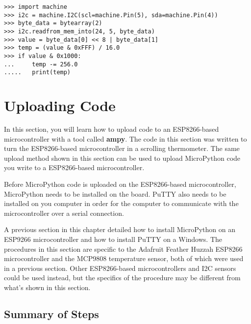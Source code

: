 \documentclass{book}
\begin{document}
\begin{lstlisting}
>>> import machine
>>> i2c = machine.I2C(scl=machine.Pin(5), sda=machine.Pin(4))
>>> byte_data = bytearray(2)
>>> i2c.readfrom_mem_into(24, 5, byte_data)
>>> value = byte_data[0] << 8 | byte_data[1]
>>> temp = (value & 0xFFF) / 16.0
>>> if value & 0x1000:
...     temp -= 256.0
.....   print(temp)
\end{lstlisting}
    




    
        \hypertarget{uploading-code}{%
\section{Uploading Code}\label{uploading-code}}
    




    
        In this section, you will learn how to upload code to an ESP8266-based
microcontroller with a tool called \textbf{ampy}. The code in this
section was written to turn the ESP8266-based microcontroller in a
scrolling thermometer. The same upload method shown in this section can
be used to upload MicroPython code you write to a ESP8266-based
microcontroller.

Before MicroPython code is uploaded on the ESP8266-based
microcontroller, MicroPython needs to be installed on the board. PuTTY
also needs to be installed on you computer in order for the computer to
communicate with the microcontroller over a serial connection.

A previous section in this chapter detailed how to install MicroPython
on an ESP9266 microcontroller and how to install PuTTY on a Windows. The
procedures in this section are specific to the Adafruit Feather Huzzah
ESP8266 microcontroller and the MCP9808 temperature sensor, both of
which were used in a previous section. Other ESP8266-based
microcontrollers and I2C sensors could be used instead, but the
specifics of the procedure may be different from what's shown in this
section.
    




    
        \hypertarget{summary-of-steps}{%
\subsection{Summary of Steps}\label{summary-of-steps}}
    
\end{document}
